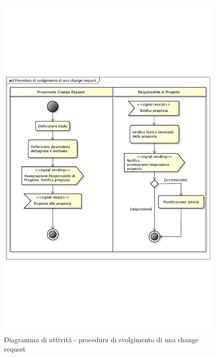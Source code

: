 				\begin{figure}[htbp]
					\centering
					\includegraphics[width=14cm]{images/proc_change_request.pdf}
					\caption{Diagramma di attività - procedura di svolgimento di una change request}
					\label{fig:procedura_generazione_change_request}
				\end{figure}


